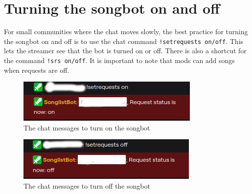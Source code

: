 
\section{Turning the songbot on and off}
For small communities where the chat moves slowly, the best practice for turning the songbot on and off is to use the chat command \lstinline{!setrequests on/off}. This lets the streamer see that the bot is turned on or off. There is also a shortcut for the command \lstinline{!srs on/off}. It is important to note that mods can add songs when requests are off.

\begin{figure}[ht!]
  \includegraphics[width=\linewidth]{src/songbot_on_off/setrequests_on.png}
  \caption{The chat messages to turn on the songbot}
  \label{setrequests on}
\end{figure}
\begin{figure}[ht!]
  \includegraphics[width=\linewidth]{src/songbot_on_off/setrequests_off.png}
  \caption{The chat messages to turn off the songbot}
  \label{setrequests off}
\end{figure}
\newpage

